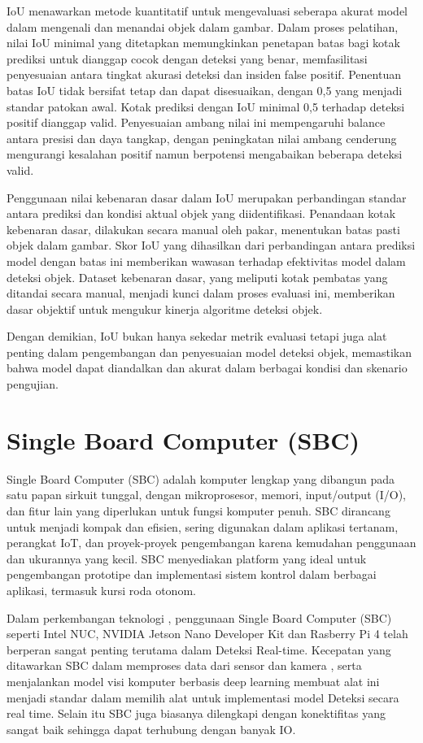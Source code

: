 IoU menawarkan metode kuantitatif untuk mengevaluasi seberapa akurat model dalam mengenali dan menandai objek dalam gambar. Dalam proses pelatihan, nilai IoU minimal yang ditetapkan memungkinkan penetapan batas bagi kotak prediksi untuk dianggap cocok dengan deteksi yang benar, memfasilitasi penyesuaian antara tingkat akurasi deteksi dan insiden false positif. Penentuan batas IoU tidak bersifat tetap dan dapat disesuaikan, dengan 0,5 yang menjadi standar patokan awal. Kotak prediksi dengan IoU minimal 0,5 terhadap deteksi positif dianggap valid. Penyesuaian ambang nilai ini mempengaruhi balance antara presisi dan daya tangkap, dengan peningkatan nilai ambang cenderung mengurangi kesalahan positif namun berpotensi mengabaikan beberapa deteksi valid.

Penggunaan nilai kebenaran dasar dalam IoU merupakan perbandingan standar antara prediksi dan kondisi aktual objek yang diidentifikasi. Penandaan kotak kebenaran dasar, dilakukan secara manual oleh pakar, menentukan batas pasti objek dalam gambar. Skor IoU yang dihasilkan dari perbandingan antara prediksi model dengan batas ini memberikan wawasan terhadap efektivitas model dalam deteksi objek. Dataset kebenaran dasar, yang meliputi kotak pembatas yang ditandai secara manual, menjadi kunci dalam proses evaluasi ini, memberikan dasar objektif untuk mengukur kinerja algoritme deteksi objek.

Dengan demikian, IoU bukan hanya sekedar metrik evaluasi tetapi juga alat penting dalam pengembangan dan penyesuaian model deteksi objek, memastikan bahwa model dapat diandalkan dan akurat dalam berbagai kondisi dan skenario pengujian. \parencite{shah2023intersection}

\section{Single Board Computer (SBC)}
Single Board Computer (SBC) adalah komputer lengkap yang dibangun pada satu papan sirkuit tunggal, dengan mikroprosesor, memori, input/output (I/O), dan fitur lain yang diperlukan untuk fungsi komputer penuh. SBC dirancang untuk menjadi kompak dan efisien, sering digunakan dalam aplikasi tertanam, perangkat IoT, dan proyek-proyek pengembangan karena kemudahan penggunaan dan ukurannya yang kecil. SBC menyediakan platform yang ideal untuk pengembangan prototipe dan implementasi sistem kontrol dalam berbagai aplikasi, termasuk kursi roda otonom.

Dalam perkembangan teknologi , penggunaan Single Board Computer (SBC) seperti Intel NUC, NVIDIA Jetson Nano Developer Kit dan Rasberry Pi 4 telah berperan sangat penting terutama dalam Deteksi Real-time. Kecepatan yang ditawarkan SBC dalam memproses data dari sensor dan kamera  , serta menjalankan model visi komputer berbasis deep learning membuat alat ini menjadi standar dalam memilih alat untuk implementasi model Deteksi secara real time. Selain itu SBC juga biasanya dilengkapi dengan konektifitas yang sangat baik sehingga dapat terhubung dengan banyak IO. \parencite{Elliot_Residing}

